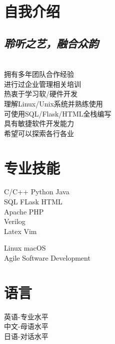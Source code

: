 \documentclass[]{deedy-resume-openfont}
\begin{document}
\begin{minipage}[t]{0.33\textwidth}
\section{自我介绍}
\subsection{\emph{聆听之艺，融合众韵}}
\quad \\
拥有多年团队合作经验 \\
进行过企业管理相关培训 \\
热衷于学习软/硬件开发 \\
理解Linux/Unix系统并熟练使用 \\
可使用SQL/Flask/HTML全栈编写\\
具有敏捷软件开发能力 \\
希望可以探索各行各业 \\
\sectionsep


\section{专业技能}
\textbullet{}   C/C++ \textbullet{}   Python \textbullet{} Java \\
\textbullet{} SQL \textbullet{}   FLask \textbullet{} HTML \\
\textbullet{} Apache \textbullet{}   PHP  \\
\textbullet{} Verilog  \\
\textbullet{} Latex \textbullet{} Vim 

\textbullet{} Linux \textbullet{} macOS\\ 
\textbullet{} Agile Software Development\\ 
\sectionsep

\section{语言} 

\textbullet{} 英语-专业水平 \\
\textbullet{} 中文-母语水平 \\
\textbullet{} 日语-对话水平\\
\sectionsep
%
%

\end{minipage} 
\end{document}
